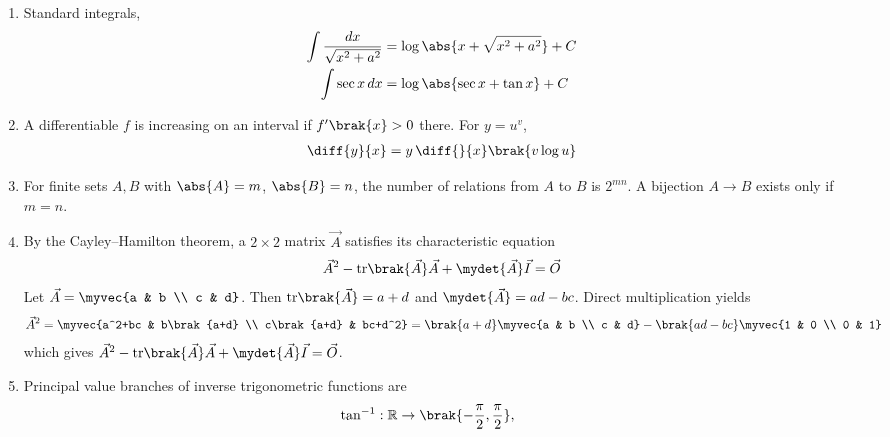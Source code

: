 \begin{enumerate}[label=\thesubsection.\arabic*, ref=\thesubsection.\theenumi]
\begin{align}
	\max_{\vec{x}} \; \vec{c}^{\top}\vec{x} \quad \text{s.t.} \quad
	\vec{A}\vec{x} \preceq \vec{b}, \; \vec{x} \succeq \vec{0}
	\label{eq:EE26BTECH11202-lpp}
\end{align}
and, if the feasible region is a bounded polygon, the optimum is attained at a corner point. If two corner points give the same optimum, so does every point on the segment joining them.
\item Standard integrals,
\begin{align}
	\int \frac{dx}{\sqrt{x^2+a^2}} &= \log\abs{x+\sqrt{x^2+a^2}} + C
	\label{eq:EE26BTECH11202-int-root}
	\\
	\int \sec x\, dx &= \log\abs{\sec x + \tan x} + C
	\label{eq:EE26BTECH11202-int-sec}
\end{align}
\item A differentiable $f$ is increasing on an interval if $f^{\prime}\brak{x} > 0$ there. For $y=u^{v}$,
\begin{align}
	\diff{y}{x} = y\,\diff{}{x}\brak{v\log u}
	\label{eq:EE26BTECH11202-logdiff}
\end{align}
\item For finite sets $A, B$ with $\abs{A}=m$, $\abs{B}=n$,
the number of relations from $A$ to $B$ is $2^{mn}$. A bijection $A \to B$ exists only if $m = n$.
\item By the Cayley--Hamilton theorem, a $2 \times 2$ matrix $\vec{A}$ satisfies its characteristic equation
\begin{align}
	\vec{A}^2 - \text{tr}\brak{\vec{A}}\vec{A} + \mydet{\vec{A}}\vec{I} = \vec{O}
	\label{eq:EE26BTECH11202-cayley}
\end{align}
\solution
Let $\vec{A} = \myvec{a & b \\ c & d}$. Then $\text{tr}\brak{\vec{A}} = a + d$ and $\mydet{\vec{A}} = ad - bc$. Direct multiplication yields
\begin{align}
	\vec{A}^2 = \myvec{a^2+bc & b\brak{a+d} \\ c\brak{a+d} & bc+d^2}
	= \brak{a+d}\myvec{a & b \\ c & d} - \brak{ad-bc}\myvec{1 & 0 \\ 0 & 1}
\end{align}
which gives $\vec{A}^2 - \text{tr}\brak{\vec{A}}\vec{A} + \mydet{\vec{A}}\vec{I} = \vec{O}$.
\item Principal value branches of inverse trigonometric functions are
\begin{align}
	\tan^{-1} &: \mathbb{R} \to \brak{-\frac{\pi}{2}, \frac{\pi}{2}}, \quad

\end{align}
\end{enumerate}
